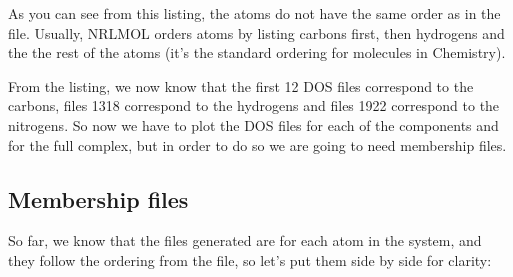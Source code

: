 \documentclass[letterpaper,10pt,english,openany,oneside]{sphinxmanual}
\begin{document}
\sphinxAtStartPar
As you can see from this listing, the atoms do not have the same order as in the  file. Usually, NRLMOL orders atoms by listing carbons first, then hydrogens and the the rest of the atoms (it’s the standard ordering for molecules in Chemistry).

\sphinxAtStartPar
From the listing, we now know that the first 12 DOS files correspond to the carbons, files 13\sphinxhyphen{}18 correspond to the hydrogens and files 19\sphinxhyphen{}22 correspond to the nitrogens. So now we have to plot the DOS files for each of the components and for the full complex, but in order to do so we are going to need membership files.


\subsection{Membership files}
\label{\detokenize{tutorials/ddos/density_of_states:membership-files}}
\sphinxAtStartPar
So far, we know that the  files generated are for each atom in the system, and they follow the ordering from the  file, so let’s put them side by side for clarity:
\end{document}
